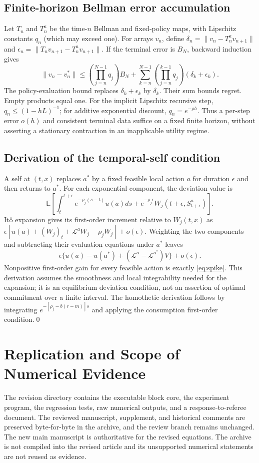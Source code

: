 \documentclass[ecta,draft]{econsocart}
\theoremstyle{definition}
\theoremstyle{remark}
\newcommand{\E}{\mathbb E}
\newcommand{\LL}{\mathcal L}
\begin{document}
\begin{appendix}
\subsection{Finite-horizon Bellman error accumulation}
Let $T_n$ and $T_n^a$ be the time-$n$ Bellman and fixed-policy maps, with Lipschitz constants $q_n$ (which may exceed one). For arrays $v_n$, define $\delta_n=\|v_n-T_n^av_{n+1}\|$ and $\epsilon_n=\|T_nv_{n+1}-T_n^av_{n+1}\|$. If the terminal error is $B_N$, backward induction gives
\[
 \|v_n-v_n^*\|\leq\left(\prod_{j=n}^{N-1}q_j\right)B_N
 +\sum_{k=n}^{N-1}\left(\prod_{j=n}^{k-1}q_j\right)(\delta_k+\epsilon_k).
\]
The policy-evaluation bound replaces $\delta_k+\epsilon_k$ by $\delta_k$. Their sum bounds regret. Empty products equal one. For the implicit Lipschitz recursive step, $q_n\leq(1-hL)^{-1}$; for additive exponential discount, $q_n=e^{-\rho h}$. Thus a per-step error $o(h)$ and consistent terminal data suffice on a fixed finite horizon, without asserting a stationary contraction in an inapplicable utility regime.

\subsection{Derivation of the temporal-self condition}
A self at $(t,x)$ replaces $a^*$ by a fixed feasible local action $a$ for duration $\epsilon$ and then returns to $a^*$. For each exponential component, the deviation value is
\[
 \E\left[\int_t^{t+\epsilon}e^{-\rho_j(s-t)}u(a)ds
     +e^{-\rho_j\epsilon}W_j(t+\epsilon,S_{t+\epsilon}^{a})\right].
\]
It\^o expansion gives its first-order increment relative to $W_j(t,x)$ as $\epsilon[u(a)+(W_j)_t+\LL^aW_j-\rho_jW_j]+o(\epsilon)$. Weighting the two components and subtracting their evaluation equations under $a^*$ leaves
\[
 \epsilon\{u(a)-u(a^*)+(\LL^a-\LL^{a^*})V\}+o(\epsilon).
\]
Nonpositive first-order gain for every feasible action is exactly \eqref{eq:spike}. This derivation assumes the smoothness and local integrability needed for the expansion; it is an equilibrium deviation condition, not an assertion of optimal commitment over a finite interval. The homothetic derivation follows by integrating $e^{-[\rho_j-b(r-m)]s}$ and applying the consumption first-order condition.\qed

\section{Replication and Scope of Numerical Evidence}\label{app:replication}
The revision directory contains the executable block core, the experiment program, the regression tests, raw numerical outputs, and a response-to-referee document. The reviewed manuscript, supplement, and historical comments are preserved byte-for-byte in the archive, and the review branch remains unchanged. The new main manuscript is authoritative for the revised equations. The archive is not compiled into the revised article and its unsupported numerical statements are not reused as evidence.


\end{appendix}
\end{document}
